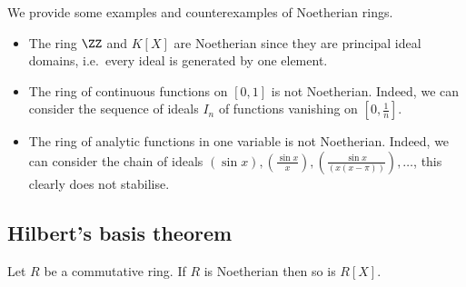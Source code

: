\documentclass[12pt, a4paper]{article}
\begin{document}
\begin{mdexample}
    We provide some examples and counterexamples of Noetherian rings.
    \begin{itemize}
        \item The ring \(\ZZ\) and \(K[X]\) are Noetherian since they are principal ideal domains, i.e.\ every ideal is generated by one element.
        \item The ring of continuous functions on \([0,1]\) is not Noetherian. Indeed, we can consider the sequence of ideals \(I_n\) of functions vanishing on \(\left[ 0,\frac{1}{n} \right]\).
        \item The ring of analytic functions in one variable is not Noetherian. Indeed, we can consider the chain of ideals \((\sin x), \left( \frac{\sin x}{x} \right), \left( \frac{\sin x}{(x(x-\pi))} \right),\ldots\), this clearly does not stabilise.
    \end{itemize}
\end{mdexample}

\subsection{Hilbert's basis theorem}

\begin{mdthm}
    Let \(R\) be a commutative ring. If \(R\) is Noetherian then so is \(R[X]\).
\end{mdthm}
\end{document}
